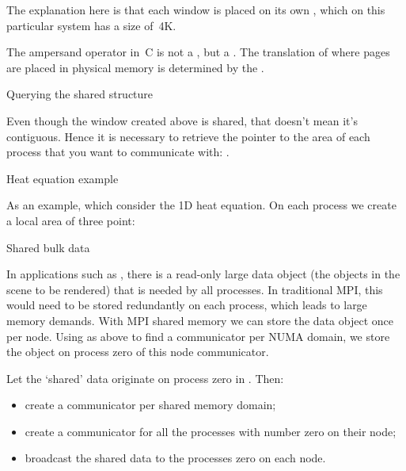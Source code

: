 The explanation here is that each window is placed 
on its own ,
which on this particular system has a size of~4K.

\begin{remark}
  The ampersand operator in~C is not a
  , but a
  .
  The translation of where pages are placed in physical memory
  is determined by the .
\end{remark}

 {Querying the shared structure}

Even though the window created above is shared, that doesn't mean it's
contiguous. Hence it is necessary to retrieve the pointer to the area
of each process that you want to communicate with:
.


 {Heat equation example}

As an example, which consider the 1D heat equation. On each process we
create a local area of three point:
%

 {Shared bulk data}

In applications such as , there is a read-only
large data object (the objects in the scene to be rendered) that is
needed by all processes. In traditional MPI, this would need to be
stored redundantly on each process, which leads to large memory
demands. With MPI shared memory we can store the data object once per
node. Using as above  to find a
communicator per \ac{NUMA} domain, we store the object on process zero
of this node communicator.

\begin{exercise}
  \label{ex:shareddata}
  Let the `shared' data originate on process zero in
  . Then:
  \begin{itemize}
  \item create a communicator per shared memory domain;
  \item create a communicator for all the processes with number zero on their
    node;
  \item broadcast the shared data to the processes zero on each node.
  \end{itemize}
\end{exercise}
